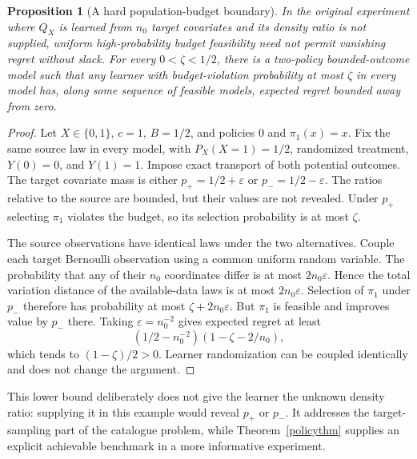 \documentclass[11pt]{article}
\newtheorem{proposition}[theorem]{Proposition}
\theoremstyle{remark}
\begin{document}
\begin{proposition}[A hard population-budget boundary]\label{budgetlower}
In the original experiment where $Q_X$ is learned from $n_0$ target covariates and its density ratio is not supplied, uniform high-probability budget feasibility need not permit vanishing regret without slack. For every $0<\zeta<1/2$, there is a two-policy bounded-outcome model such that any learner with budget-violation probability at most $\zeta$ in every model has, along some sequence of feasible models, expected regret bounded away from zero.
\end{proposition}
\begin{proof}
Let $X\in\{0,1\}$, $c=1$, $B=1/2$, and policies $0$ and $\pi_1(x)=x$. Fix the same source law in every model, with $P_X(X=1)=1/2$, randomized treatment, $Y(0)=0$, and $Y(1)=1$. Impose exact transport of both potential outcomes. The target covariate mass is either
$p_+=1/2+\varepsilon$ or $p_-=1/2-\varepsilon$.
The ratios relative to the source are bounded, but their values are not revealed. Under $p_+$ selecting $\pi_1$ violates the budget, so its selection probability is at most $\zeta$.

The source observations have identical laws under the two alternatives. Couple each target Bernoulli observation using a common uniform random variable. The probability that any of their $n_0$ coordinates differ is at most $2n_0\varepsilon$. Hence the total variation distance of the available-data laws is at most $2n_0\varepsilon$. Selection of $\pi_1$ under $p_-$ therefore has probability at most $\zeta+2n_0\varepsilon$. But $\pi_1$ is feasible and improves value by $p_-$ there. Taking $\varepsilon=n_0^{-2}$ gives expected regret at least
\[
 (1/2-n_0^{-2})(1-\zeta-2/n_0),
\]
which tends to $(1-\zeta)/2>0$. Learner randomization can be coupled identically and does not change the argument.
\end{proof}

This lower bound deliberately does not give the learner the unknown density ratio: supplying it in this example would reveal $p_+$ or $p_-$. It addresses the target-sampling part of the catalogue problem, while Theorem~\ref{policythm} supplies an explicit achievable benchmark in a more informative experiment.
\end{document}
